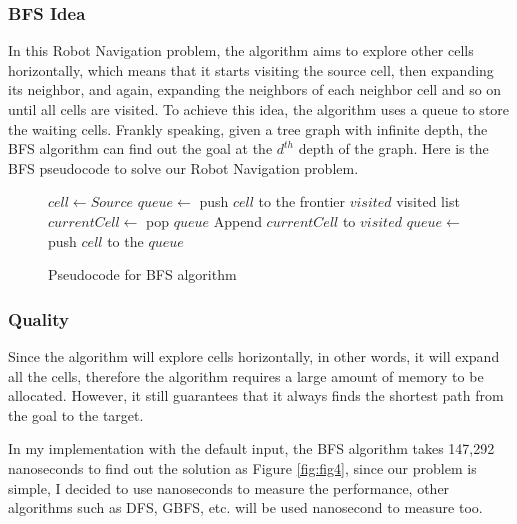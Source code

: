 \documentclass{assignment}
\begin{document}
\subsubsection{BFS Idea}
In this Robot Navigation problem, the algorithm aims to explore other cells horizontally, which means that it starts visiting the source cell, then expanding its neighbor, and again, expanding the neighbors of each neighbor cell and so on until all cells are visited. To achieve this idea, the algorithm uses a queue to store the waiting cells. Frankly speaking, given a tree graph with infinite depth, the BFS algorithm can find out the goal at the $d^{th}$ depth of the graph. 
Here is the BFS pseudocode to solve our Robot Navigation problem. 

\begin{figure}[htbp]
    \centering
    \begin{mdframed}
      \begin{algorithmic}
        \STATE $cell \gets Source$
        \STATE $queue \gets $ push $cell$ to the frontier
        \STATE $visited$ visited list
            \STATE $currentCell \gets$ pop $queue$
            \STATE Append $currentCell$ to $visited$ 
                    \STATE $queue \gets $ push $cell$ to the $queue$
                \ENDIF
            \ENDFOR
        \ENDWHILE
      \end{algorithmic}
    \end{mdframed}
    \caption{Pseudocode for BFS algorithm}
    \label{fig:fig3}
  \end{figure}

\subsubsection{Quality}
Since the algorithm will explore cells horizontally, in other words, it will expand all the cells, therefore the algorithm requires a large amount of memory to be allocated. However, it still guarantees that it always finds the shortest path from the goal to the target.

In my implementation with the default input, the BFS algorithm takes 147,292 nanoseconds to find out the solution as Figure \ref{fig:fig4}, since our problem is simple, I decided to use nanoseconds to measure the performance, other algorithms such as DFS, GBFS, etc. will be used nanosecond to measure too. 
\end{document}
